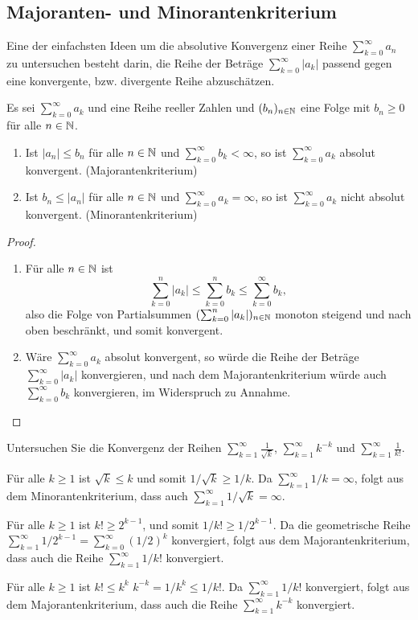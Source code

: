 \documentclass[a4paper,10pt]{article}
\begin{document}
\subsection{Majoranten- und Minorantenkriterium}

Eine der einfachsten Ideen um die absolutive Konvergenz einer Reihe $\sum_{k=0}^\infty a_n$ zu untersuchen besteht darin, die Reihe der Beträge $\sum_{k=0}^\infty |a_k|$ passend gegen eine konvergente, bzw. divergente Reihe abzuschätzen.


\begin{lem}
 Es sei $\sum_{k=0}^\infty a_k$ und eine Reihe reeller Zahlen und $(b_n)_{n \in \mathbb{N}}$ eine Folge mit $b_n \geq 0$ für alle $n \in \mathbb{N}$.
 \begin{enumerate}
  \item
   Ist $|a_n| \leq b_n$ für alle $n \in \mathbb{N}$ und $\sum_{k=0}^\infty b_k < \infty$, so ist $\sum_{k=0}^\infty a_k$ absolut konvergent. (Majorantenkriterium)
  \item
   Ist $b_n \leq |a_n|$ für alle $n \in \mathbb{N}$ und $\sum_{k=0}^\infty a_k = \infty$, so ist $\sum_{k=0}^\infty a_k$ nicht absolut konvergent. (Minorantenkriterium)
 \end{enumerate}
\end{lem}
\begin{proof}
 \begin{enumerate}
  \item
   Für alle $n \in \mathbb{N}$ ist
   \[
    \sum_{k=0}^n |a_k| \leq \sum_{k=0}^n b_k \leq \sum_{k=0}^\infty b_k,
   \]
   also die Folge von Partialsummen $(\sum_{k=0}^n |a_k|)_{n \in \mathbb{N}}$ monoton steigend und nach oben beschränkt, und somit konvergent.
  \item
   Wäre $\sum_{k=0}^\infty a_k$ absolut konvergent, so würde die Reihe der Beträge $\sum_{k=0}^\infty |a_k|$ konvergieren, und nach dem Majorantenkriterium würde auch $\sum_{k=0}^\infty b_k$ konvergieren, im Widerspruch zu Annahme.
  \qedhere
 \end{enumerate}
\end{proof}


\begin{question}
 Untersuchen Sie die Konvergenz der Reihen $\sum_{k=1}^\infty \frac{1}{\sqrt{k}}$, $\sum_{k=1}^\infty k^{-k}$ und $\sum_{k=1}^\infty \frac{1}{k!}$.
\end{question}
\begin{solution}
 Für alle $k \geq 1$ ist $\sqrt{k} \leq k$ und somit $1/\sqrt{k} \geq 1/k$. Da $\sum_{k=1}^\infty 1/k = \infty$, folgt aus dem Minorantenkriterium, dass auch $\sum_{k=1}^\infty 1/\sqrt{k} = \infty$.
 
 Für alle $k \geq 1$ ist $k! \geq 2^{k-1}$, und somit $1/k! \geq 1/2^{k-1}$. Da die geometrische Reihe $\sum_{k=1}^\infty 1/2^{k-1} = \sum_{k=0}^\infty (1/2)^k$ konvergiert, folgt aus dem Majorantenkriterium, dass auch die Reihe $\sum_{k=1}^\infty 1/k!$ konvergiert.
 
 Für alle $k \geq 1$ ist $k! \leq k^k$ $k^{-k} = 1/k^k \leq 1/k!$. Da $\sum_{k=1}^\infty 1/k!$ konvergiert, folgt aus dem Majorantenkriterium, dass auch die Reihe $\sum_{k=1}^\infty k^{-k}$ konvergiert.
\end{solution}
\end{document}
